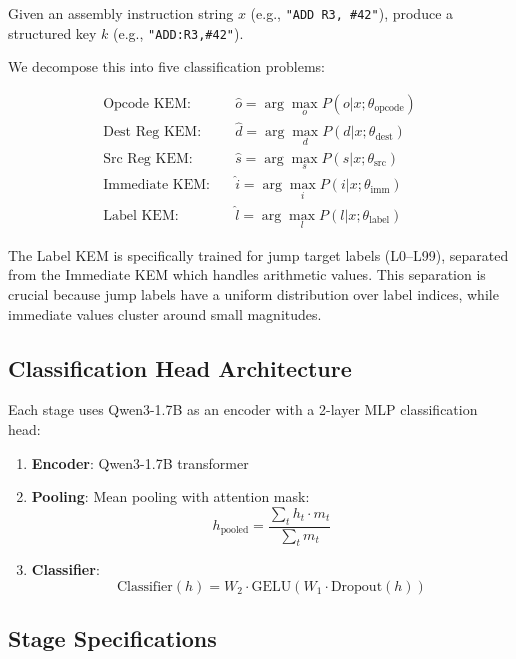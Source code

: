 \documentclass[11pt]{article}
\begin{document}
Given an assembly instruction string $x$ (e.g., \texttt{"ADD R3, \#42"}), produce a structured key $k$ (e.g., \texttt{"ADD:R3,\#42"}).

We decompose this into five classification problems:

\begin{align}
    \text{Opcode KEM:} \quad & \hat{o} = \arg\max_o P(o | x; \theta_{\text{opcode}}) \\
    \text{Dest Reg KEM:} \quad & \hat{d} = \arg\max_d P(d | x; \theta_{\text{dest}}) \\
    \text{Src Reg KEM:} \quad & \hat{s} = \arg\max_s P(s | x; \theta_{\text{src}}) \\
    \text{Immediate KEM:} \quad & \hat{i} = \arg\max_i P(i | x; \theta_{\text{imm}}) \\
    \text{Label KEM:} \quad & \hat{l} = \arg\max_l P(l | x; \theta_{\text{label}})
\end{align}

The Label KEM is specifically trained for jump target labels (L0--L99), separated from the Immediate KEM which handles arithmetic values. This separation is crucial because jump labels have a uniform distribution over label indices, while immediate values cluster around small magnitudes.

\subsection{Classification Head Architecture}

Each stage uses Qwen3-1.7B as an encoder with a 2-layer MLP classification head:

\begin{enumerate}
    \item \textbf{Encoder}: Qwen3-1.7B transformer
    \item \textbf{Pooling}: Mean pooling with attention mask:
    \[
    h_{\text{pooled}} = \frac{\sum_t h_t \cdot m_t}{\sum_t m_t}
    \]
    \item \textbf{Classifier}:
    \[
    \text{Classifier}(h) = W_2 \cdot \text{GELU}(W_1 \cdot \text{Dropout}(h))
    \]
\end{enumerate}

\subsection{Stage Specifications}
\end{document}

